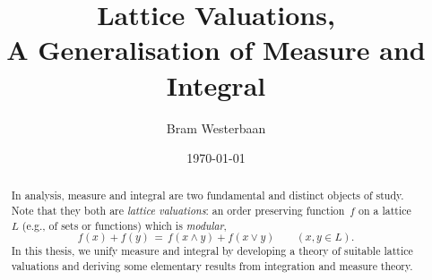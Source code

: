 \documentclass[
  a4paper,
  draft,
  twoside,
  reqno
]{amsart}
\begin{document}
\title[A Generalisation of Measure and Integral]{Lattice Valuations,\\
A Generalisation of Measure and Integral}

\author[A.A.~Westerbaan]{Bram Westerbaan}
\date{\today \quad{\tiny \version}}
\maketitle

\begin{abstract}
In analysis,
measure and integral are two fundamental
and distinct
objects of study.
Note that they
both are \emph{lattice valuations}:
an order preserving function~$f$
on a lattice~$L$ (e.g., of sets or functions)
which is \emph{modular},
\begin{equation*}
f(x) + f(y) \,=\, f(x\wedge y) + f(x\vee y)\qquad(x,y\in L).
\end{equation*}
In this thesis,
we unify measure and integral
by developing a theory of suitable lattice valuations
and deriving some elementary results from
integration and measure theory.
\end{abstract}

{  }


{}

\end{document}
